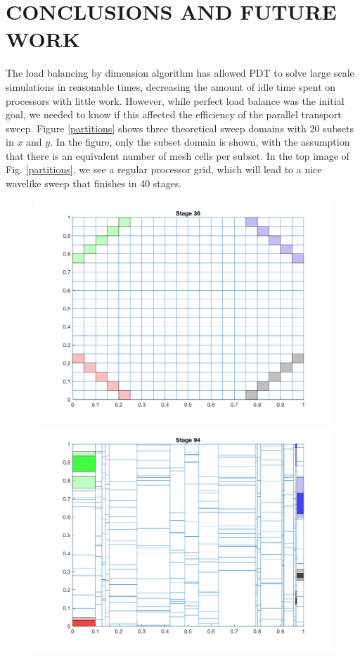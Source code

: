 \documentclass[letterpaper]{mandc2019}
\begin{document}
{\FloatBarrier
\section{CONCLUSIONS AND FUTURE WORK}
The load balancing by dimension algorithm has allowed PDT to solve large scale simulations in reasonable times, decreasing the amount of idle time spent on processors with little work. However, while perfect load balance was the initial goal, we needed to know if this affected the efficiency of the parallel transport sweep. 
Figure \ref{partitions} shows three theoretical sweep domains with 20 subsets in $x$ and $y$. In the figure, only the subset domain is shown, with the assumption that there is an equivalent number of mesh cells per subset. In the top image of Fig. \ref{partitions}, we see a regular processor grid, which will lead to a nice wavelike sweep that finishes in 40 stages. 
\begin{figure}[!htb]
  \centering
  \includegraphics[scale=0.4]{Figures/regular_partition_4.png}
   \includegraphics[scale=0.4]{Figures/random_partition_4.png}

\end{figure}}
\end{document}
